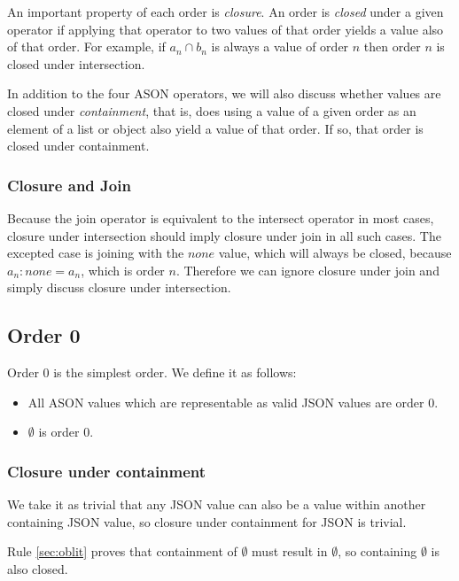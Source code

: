\documentclass[letterpaper]{article}
\begin{document}
An important property of each order is \textit{closure}. An order is
\textit{closed} under a given operator if applying that operator to two values
of that order yields a value also of that order. For example, if \(a_n \cap
b_n\) is always a value of order \(n\) then order \(n\) is closed under
intersection.

In addition to the four ASON operators, we will also discuss whether values are
closed under \textit{containment}, that is, does using a value of a given order
as an element of a list or object also yield a value of that order. If so, that
order is closed under containment.

\subsubsection{Closure and Join}

Because the join operator is equivalent to the intersect operator in most
cases, closure under intersection should imply closure under join in all such
cases. The excepted case is joining with the \(none\) value, which will always
be closed, because \(a_n : none = a_n\), which is order \(n\). Therefore we can
ignore closure under join and simply discuss closure under intersection.

\subsection{Order 0}

Order 0 is the simplest order. We define it as follows:

\begin{itemize}
	\item All ASON values which are representable as valid JSON values are
		order 0.
	\item \(\emptyset\) is order 0.
\end{itemize}

\subsubsection{Closure under containment}

We take it as trivial that any JSON value can also be a value within another
containing JSON value, so closure under containment for JSON is trivial.

Rule \ref{sec:oblit} proves that containment of \(\emptyset\) must result in
\(\emptyset\), so containing \(\emptyset\) is also closed.
\end{document}
